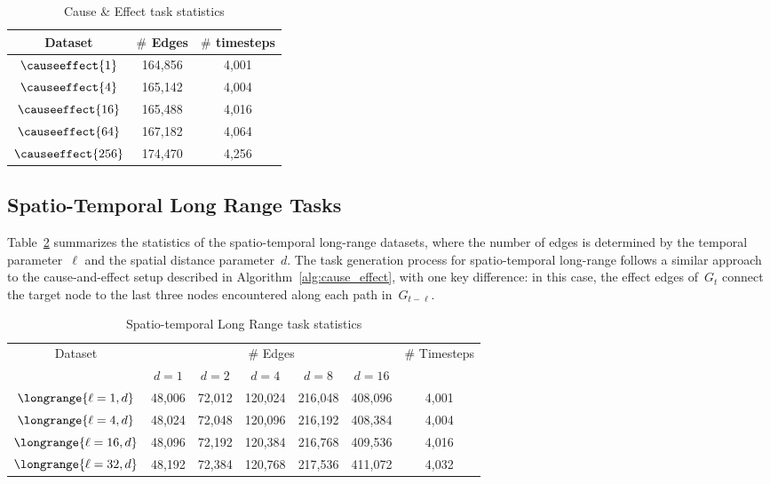 \begin{table}[h]
    \caption{Cause \& Effect task statistics}
    \centering
    \begin{tabular}{c|c|c}
        \toprule
        Dataset & $\#$ Edges & $\#$ timesteps \\
        \midrule
        $\causeeffect{1}$& 164,856 & 4,001 \\ 
        $\causeeffect{4}$& 165,142 & 4,004 \\ 
        $\causeeffect{16}$& 165,488 & 4,016 \\ 
        $\causeeffect{64}$& 167,182 & 4,064 \\ 
        $\causeeffect{256}$& 174,470 & 4,256 \\ 
    \end{tabular}
    \label{tab:cause_and_effect_stats}
\end{table}

\subsection{Spatio-Temporal Long Range Tasks}
Table~\ref{tab:spatio_long_range_stats} summarizes the statistics of the spatio-temporal long-range datasets, where the number of edges is determined by the temporal parameter~\( \ell \) and the spatial distance parameter~\( d \). The task generation process for spatio-temporal long-range follows a similar approach to the cause-and-effect setup described in Algorithm~\ref{alg:cause_effect}, with one key difference: in this case, the effect edges of~\( G_t \) connect the target node to the last three nodes encountered along each path in~\( G_{t - \ell} \).

\begin{table}[h]
    \caption{Spatio-temporal Long Range task statistics}
    \centering
    \begin{tabular}{c|ccccc|c}
        \toprule
        \multirow{2}{*}{Dataset} & \multicolumn{5}{c|}{$\#$ Edges} & \multirow{2}{*}{$\#$ Timesteps} \\
        & $d=1$ & $d=2$ & $d=4$ & $d=8$ & $d=16$ & \\
        \midrule
        $\longrange{\ell=1, d}$ & 48,006 & 72,012 & 120,024 & 216,048 & 408,096 & 4,001 \\
        $\longrange{\ell=4, d}$ & 48,024 & 72,048 & 120,096 & 216,192 & 408,384 & 4,004 \\
        $\longrange{\ell=16, d}$ & 48,096 & 72,192 & 120,384 & 216,768 & 409,536 & 4,016 \\
        $\longrange{\ell=32, d}$ & 48,192 & 72,384 & 120,768 & 217,536 & 411,072 & 4,032 \\
    \end{tabular}
    \label{tab:spatio_long_range_stats}
\end{table}


